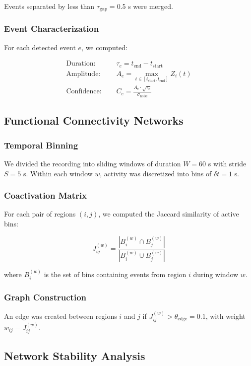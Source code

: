 \documentclass[11pt,twocolumn]{article}
\begin{document}
Events separated by less than $\tau_{\text{gap}} = 0.5$ s were merged.

\subsubsection{Event Characterization}
For each detected event $e$, we computed:

\begin{align}
\text{Duration: } \quad & \tau_e = t_{\text{end}} - t_{\text{start}} \\
\text{Amplitude: } \quad & A_e = \max_{t \in [t_{\text{start}}, t_{\text{end}}]} Z_i(t) \\
\text{Confidence: } \quad & C_e = \frac{A_e \cdot \sqrt{\tau_e}}{\sigma_{\text{noise}}}
\end{align}

\subsection{Functional Connectivity Networks}

\subsubsection{Temporal Binning}
We divided the recording into sliding windows of duration $W = 60$ s with stride $S = 5$ s. Within each window $w$, activity was discretized into bins of $\delta t = 1$ s.

\subsubsection{Coactivation Matrix}
For each pair of regions $(i,j)$, we computed the Jaccard similarity of active bins:

\begin{equation}
J_{ij}^{(w)} = \frac{|B_i^{(w)} \cap B_j^{(w)}|}{|B_i^{(w)} \cup B_j^{(w)}|}
\end{equation}

where $B_i^{(w)}$ is the set of bins containing events from region $i$ during window $w$.

\subsubsection{Graph Construction}
An edge was created between regions $i$ and $j$ if $J_{ij}^{(w)} > \theta_{\text{edge}} = 0.1$, with weight $w_{ij} = J_{ij}^{(w)}$.

\subsection{Network Stability Analysis}
\end{document}
